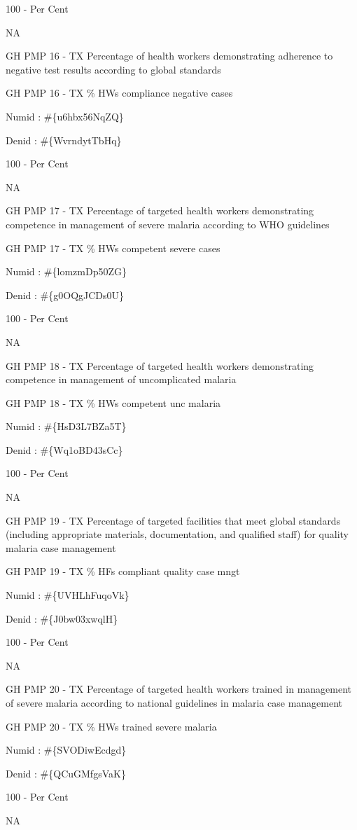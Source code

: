 \documentclass[]{book}
\begin{document}
100 - Per Cent

NA

GH PMP 16 - TX Percentage of health workers demonstrating adherence to negative test results according to global standards

GH PMP 16 - TX \% HWs compliance negative cases

Numid : \#\{u6hbx56NqZQ\}

Denid : \#\{WvrndytTbHq\}

100 - Per Cent

NA

GH PMP 17 - TX Percentage of targeted health workers demonstrating competence in management of severe malaria according to WHO guidelines

GH PMP 17 - TX \% HWs competent severe cases

Numid : \#\{lomzmDp50ZG\}

Denid : \#\{g0OQgJCDs0U\}

100 - Per Cent

NA

GH PMP 18 - TX Percentage of targeted health workers demonstrating competence in management of uncomplicated malaria

GH PMP 18 - TX \% HWs competent unc malaria

Numid : \#\{HsD3L7BZa5T\}

Denid : \#\{Wq1oBD43sCc\}

100 - Per Cent

NA

GH PMP 19 - TX Percentage of targeted facilities that meet global standards (including appropriate materials, documentation, and qualified staff) for quality malaria case management

GH PMP 19 - TX \% HFs compliant quality case mngt

Numid : \#\{UVHLhFuqoVk\}

Denid : \#\{J0bw03xwqlH\}

100 - Per Cent

NA

GH PMP 20 - TX Percentage of targeted health workers trained in management of severe malaria according to national guidelines in malaria case management

GH PMP 20 - TX \% HWs trained severe malaria

Numid : \#\{SVODiwEcdgd\}

Denid : \#\{QCuGMfgsVaK\}

100 - Per Cent

NA
\end{document}
